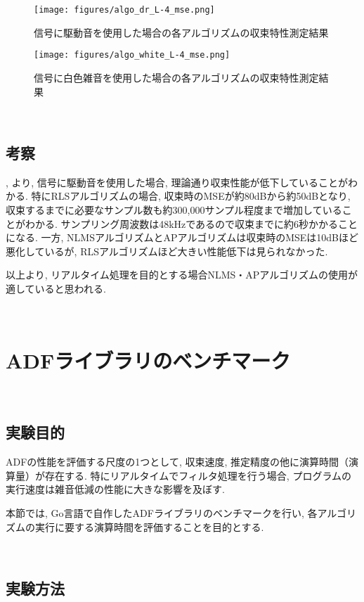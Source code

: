 \begin{figure}[H]
\centering
\texttt{[image: figures/algo\_dr\_L-4\_mse.png]}
\caption{信号に駆動音を使用した場合の各アルゴリズムの収束特性測定結果}
\label{fig:drone_algo_convergence}
\end{figure}

\begin{figure}[H]
\centering
\texttt{[image: figures/algo\_white\_L-4\_mse.png]}
\caption{信号に白色雑音を使用した場合の各アルゴリズムの収束特性測定結果}
\label{fig:white_algo_convergence}
\end{figure}

\
\subsection{考察}\label{consideration-color}

, より, 信号に駆動音を使用した場合, 理論通り収束性能が低下していることがわかる. 特にRLSアルゴリズムの場合, 収束時のMSEが約80dBから約50dBとなり, 収束するまでに必要なサンプル数も約300,000サンプル程度まで増加していることがわかる. サンプリング周波数は48kHzであるので収束までに約6秒かかることになる. 一方, NLMSアルゴリズムとAPアルゴリズムは収束時のMSEは10dBほど悪化しているが, RLSアルゴリズムほど大きい性能低下は見られなかった. 

以上より, リアルタイム処理を目的とする場合NLMS・APアルゴリズムの使用が適していると思われる. 

\
\section{ADFライブラリのベンチマーク}\label{benchmark}

\
\subsection{実験目的}\label{purpose-benchmark}

ADFの性能を評価する尺度の1つとして, 収束速度, 推定精度の他に演算時間（演算量）が存在する. 
特にリアルタイムでフィルタ処理を行う場合, プログラムの実行速度は雑音低減の性能に大きな影響を及ぼす. 

本節では, Go言語で自作したADFライブラリのベンチマークを行い, 各アルゴリズムの実行に要する演算時間を評価することを目的とする. 

\
\subsection{実験方法}\label{instruction-benchmark}

